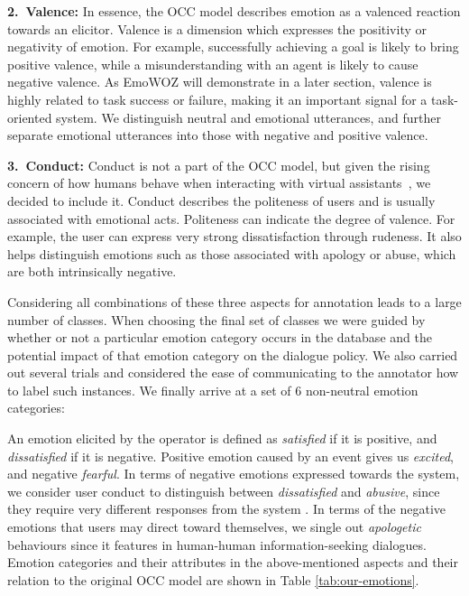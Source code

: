 \documentclass[10pt, a4paper]{article}
\begin{document}
\textbf{2.\ Valence:} In essence, the OCC model describes emotion as a valenced reaction towards an elicitor. Valence is a dimension which expresses the positivity or negativity of emotion. For example, successfully achieving a goal is likely to bring positive valence, while a misunderstanding with an agent is likely to cause negative valence. As EmoWOZ will demonstrate in a later section, valence is highly related to task success or failure, making it an important signal for a task-oriented system. We distinguish neutral and emotional utterances, and further separate emotional utterances into those with negative and positive valence.\par

\textbf{3.\ Conduct:} Conduct is not a part of the OCC model, but given the rising concern of how humans behave when interacting with virtual assistants~\cite{cercas-curry-rieser-2018-metoo}, we decided to include it. Conduct describes the politeness of users and is usually associated with emotional acts. Politeness can indicate the degree of valence. For example, the user can express very strong dissatisfaction through rudeness. It also helps distinguish emotions such as those associated with apology or abuse, which are both intrinsically negative.

Considering all combinations of these three aspects for annotation leads to a large number of classes. When choosing the final set of classes we were guided by whether or not a particular emotion category occurs in the database and the potential impact of that emotion category on the dialogue policy. We also carried out several trials and considered the ease of communicating to the annotator how to label such instances. We finally arrive at a set of 6 non-neutral emotion categories:

An emotion elicited by the operator is defined as \textit{satisfied} if it is positive, and \textit{dissatisfied} if it is negative. Positive emotion caused by an event gives us \textit{excited}, and negative \textit{fearful}. In terms of negative emotions expressed towards the system, we consider user conduct to distinguish between \textit{dissatisfied} and \textit{abusive}, since they require very different responses from the system \cite{curry2019crowd}. In terms of the negative emotions that users may direct toward themselves, we single out \textit{apologetic} behaviours since it features in human-human information-seeking dialogues. Emotion categories and their attributes in the above-mentioned aspects and their relation to the original OCC model are shown in Table \ref{tab:our-emotions}.
\end{document}
